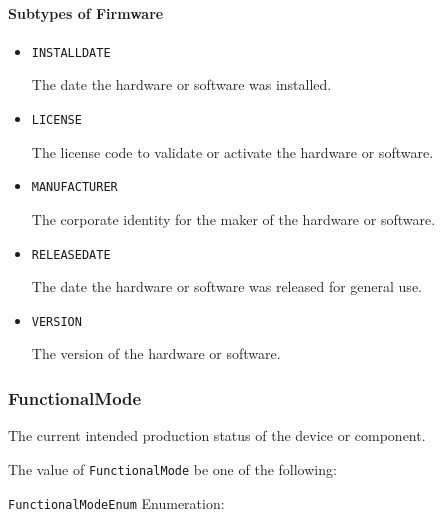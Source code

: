 \paragraph{Subtypes of Firmware}\mbox{}
\label{sec:Subtypes of Firmware}

\begin{itemize}

\item \texttt{INSTALL\textunderscore DATE}


The date the hardware or software was installed.

\item \texttt{LICENSE}


The license code to validate or activate the hardware or software.

\item \texttt{MANUFACTURER}


The corporate identity for the maker of the hardware or software.


\item \texttt{RELEASE\textunderscore DATE}


The date the hardware or software was released for general use.


\item \texttt{VERSION}


The version of the hardware or software.


\end{itemize}








\subsubsection{FunctionalMode}
\label{sec:FunctionalMode}



The current intended production status of the device or component.


The value of \texttt{FunctionalMode} \MUST be one of the following: 


\texttt{FunctionalModeEnum} Enumeration:

